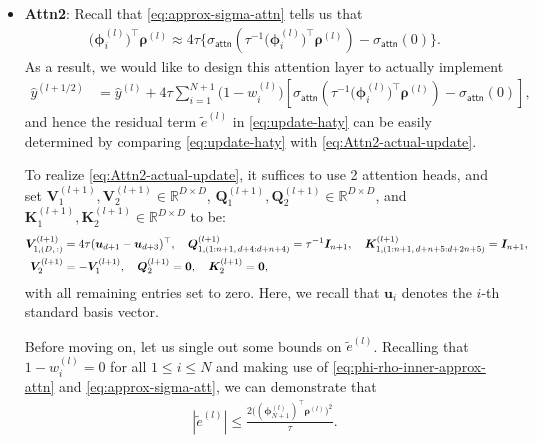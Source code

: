 \documentclass[english]{article}
\begin{document}
\begin{itemize}
\item \textbf{Attn2}: Recall that \eqref{eq:approx-sigma-attn} tells us that
%
\begin{align}
\label{eq:phi-rho-inner-approx-attn}
\big({\bm \phi}_{i}^{(l)}\big)^{\top}{\bm \rho}^{(l)}\approx 4\tau\Big\{\sigma_{\mathsf{attn}}\left(\tau^{-1}\big({\bm \phi}_{i}^{(l)}\big)^{\top}{\bm \rho}^{(l)}\right) - \sigma_{\mathsf{attn}}(0)\Big\}.
\end{align}
%
As a result, we would like to design 
this attention layer to actually implement 
%
\begin{align}
\widehat{y}^{(l+1/2)} &= \widehat{y}^{(l)} +4\tau \sum_{i = 1}^{N+1} \big(1-{w}_i^{(l)}\big)\left[\sigma_{\mathsf{attn}}\left(\tau^{-1}\big({\bm \phi}_{i}^{(l)}\big)^{\top}{\bm \rho}^{(l)}\right) - \sigma_{\mathsf{attn}}(0) \right], 
\label{eq:Attn2-actual-update}
\end{align}
%
and hence the residual term $\widetilde{e}^{(l)}$ in \eqref{eq:update-haty} can be easily determined by comparing \eqref{eq:update-haty} with \eqref{eq:Attn2-actual-update}. 

To realize \eqref{eq:Attn2-actual-update}, it suffices to use 2 attention heads, and 
set ${\bm V}_1^{(l+1)},{\bm V}_2^{(l+1)}\in\mathbb{R}^{D\times D}$, ${\bm Q}_1^{(l+1)},{\bm Q}_2^{(l+1)}\in\mathbb{R}^{D\times D}$, and ${\bm K}_1^{(l+1)},{\bm K}_2^{(l+1)}\in\mathbb{R}^{D\times D}$ to be:
%
\begin{align*}
{\bm V}_{1,(D,\,:)}^{(l+1)} &= 4\tau({\bm u}_{d+1} - {\bm u}_{d+3})^{\top},\quad {\bm Q}_{1,(1:n+1,\,d+4:d+n+4)}^{(l+1)} = \tau^{-1}{\bm I}_{n+1},\quad {\bm K}_{1,(1:n+1,\,d+n+5:d+2n+5)}^{(l+1)} = {\bm I}_{n+1},\notag\\
{\bm V}_2^{(l+1)} &= -{\bm V}_1^{(l+1)},\quad {\bm Q}_2^{(l+1)} = {\bm 0}, \quad {\bm K}_2^{(l+1)} = {\bm 0},
\end{align*}
with all remaining entries set to zero. Here, we recall that $\bm{u}_i$ denotes the $i$-th standard basis vector. 


Before moving on, let us single out some bounds on $\widetilde{e}^{(l)}$. 
%
%
Recalling that $1-{{w}}_i^{(l)} = 0$ for all $1\le i\le N$ and making use of \eqref{eq:phi-rho-inner-approx-attn} and \eqref{eq:approx-sigma-att}, we can demonstrate that
%
\begin{align}
\label{eq:proof-bound-e-prime}
|\widetilde{e}^{(l)}|\le \frac{2\big(({\bm \phi}_{N+1}^{(l)})^{\top}{\bm \rho}^{(l)}\big)^2}{\tau}.
\end{align}
%


\end{itemize}
\end{document}

